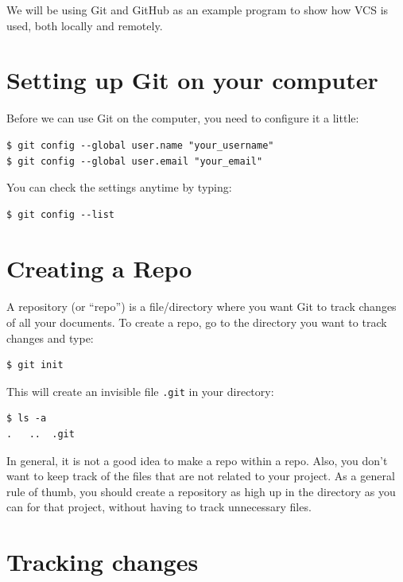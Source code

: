 \documentclass[a4paper, 12pt]{article}
\begin{document}
We will be using Git and GitHub as an example program to show how VCS is used, both locally and remotely.

\section*{Setting up Git on your computer}

Before we can use Git on the computer, you need to configure it a little:

\begin{lstlisting}
$ git config --global user.name "your_username"
$ git config --global user.email "your_email"
\end{lstlisting}
You can check the settings anytime by typing:

\begin{lstlisting}
$ git config --list
\end{lstlisting}

\section*{Creating a Repo}

A repository (or ``repo'') is a file/directory where you want Git to track changes of all your documents.
To create a repo, go to the directory you want to track changes and type:

\begin{lstlisting}
$ git init
\end{lstlisting}
This will create an invisible file \verb|.git| in your directory:

\begin{lstlisting}
$ ls -a
.   ..  .git
\end{lstlisting}
In general, it is not a good idea to make a repo within a repo.
Also, you don't want to keep track of the files that are not related to your project.
As a general rule of thumb, you should create a repository as high up in the directory as you can for that project, without having to track unnecessary files.

\section*{Tracking changes}
\end{document}
